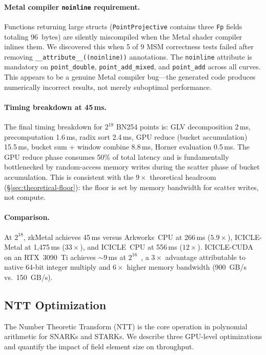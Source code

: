 \paragraph{Metal compiler \texttt{noinline} requirement.}
Functions returning large structs (\texttt{PointProjective} contains
three \texttt{Fp} fields totaling 96~bytes) are silently miscompiled when the
Metal shader compiler inlines them. We discovered this when 5 of 9 MSM
correctness tests failed after removing \texttt{\_\_attribute\_\_((noinline))}
annotations. The \texttt{noinline} attribute is mandatory on
\texttt{point\_double}, \texttt{point\_add\_mixed}, and \texttt{point\_add}
across all curves. This appears to be a genuine Metal compiler bug---the
generated code produces numerically incorrect results, not merely suboptimal
performance.

\paragraph{Timing breakdown at 45\,ms.}
The final timing breakdown for $2^{18}$ BN254 points is: GLV decomposition
2\,ms, precomputation 1.6\,ms, radix sort 2.4\,ms, GPU reduce (bucket
accumulation) 15.5\,ms, bucket sum + window combine 8.8\,ms, Horner evaluation
0.5\,ms. The GPU reduce phase consumes 50\% of total latency and is
fundamentally bottlenecked by random-access memory writes during the scatter
phase of bucket accumulation. This is consistent with the $9\times$ theoretical
headroom (\S\ref{sec:theoretical-floor}): the floor is set by memory bandwidth
for scatter writes, not compute.

\paragraph{Comparison.}
At $2^{18}$, zkMetal achieves 45\,ms versus Arkworks~CPU at 266\,ms
($5.9\times$), ICICLE-Metal at 1{,}475\,ms ($33\times$), and ICICLE~CPU at
556\,ms ($12\times$). ICICLE-CUDA on an RTX~3090~Ti achieves ${\sim}9$\,ms at
$2^{16}$~\cite{icicle}, a $3\times$ advantage attributable to native 64-bit
integer multiply and $6\times$ higher memory bandwidth (900~GB/s vs.\
150~GB/s).

\subsection{NTT Optimization}
\label{sec:ntt-opt}

The Number Theoretic Transform (NTT) is the core operation in polynomial
arithmetic for SNARKs and STARKs. We describe three GPU-level optimizations
and quantify the impact of field element size on throughput.

